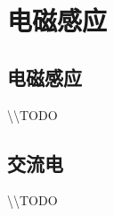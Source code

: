 
\section{电磁感应}

\subsection{电磁感应}

\textbackslash\textbackslash TODO

\subsection{交流电}

\textbackslash\textbackslash TODO
